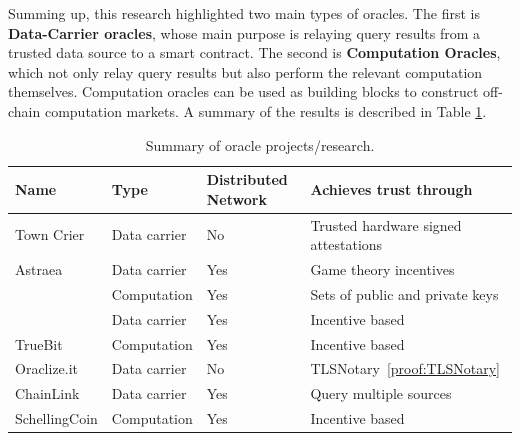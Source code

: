 Summing up, this research highlighted two main types of oracles. The first is \textbf{Data-Carrier oracles}, whose main purpose is relaying query results from a trusted data source to a smart contract. The second is \textbf{Computation Oracles}, which not only relay query results but also perform the relevant computation themselves. Computation oracles can be used as building blocks to construct off-chain computation markets. A summary of the results is described in Table \ref{oracle-summary}.



\begin{table}[]
  \centering
  \begin{tabular}{llll}
    \hline
    Name                                      & Type         & Distributed Network & Achieves trust through               \\ \hline
    Town Crier                                & Data carrier & No                  & Trusted hardware signed attestations \\
    Astraea                                   & Data carrier & Yes                 & Game theory incentives               \\
    \cite{Gordon2017ProvenanceSensorsb}       & Computation  & Yes                 & Sets of public and private keys      \\
    \cite{MontotoMonroy2018BitcoinBlockchain} & Data carrier & Yes                 & Incentive based                      \\
    TrueBit                                   & Computation  & Yes                 & Incentive based                      \\
    Oraclize.it                               & Data carrier & No                  & TLSNotary~\ref{proof:TLSNotary}                            \\
    ChainLink                                 & Data carrier & Yes                 & Query multiple sources               \\
    SchellingCoin                             & Computation  & Yes                 & Incentive based                      \\ \hline
  \end{tabular}
  \caption{Summary of oracle projects/research.}
  \label{oracle-summary}
\end{table}

